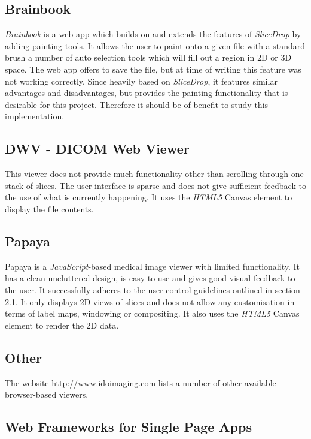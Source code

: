 \documentclass[a4paper,11pt,titlepage]{article}
\begin{document}
\subsection{Brainbook}
\textit{Brainbook}\cite{brainbook} is a web-app which builds on and extends the features of \textit{SliceDrop} by adding painting tools. It allows the user to paint onto a given file with a standard brush a number of auto selection tools which will fill out a region in 2D or 3D space. The web app offers to save the file, but at time of writing this feature was not working correctly. Since heavily based on \textit{SliceDrop}, it features similar advantages and disadvantages, but provides the painting functionality that is desirable for this project. Therefore it should be of benefit to study this implementation.

\subsection{DWV - DICOM Web Viewer}
This viewer does not provide much functionality other than scrolling through one stack of slices. The user interface is sparse and does not give sufficient feedback to the use of what is currently happening. It uses the \textit{HTML5} Canvas element to display the file contents.



\subsection{Papaya}
Papaya\cite{papaya} is a \textit{JavaScript}-based medical image viewer with limited functionality. It has a clean uncluttered design, is easy to use and gives good visual feedback to the user. It successfully adheres to the user control guidelines outlined in section 2.1. It only displays 2D views of slices and does not allow any customisation in terms of label maps, windowing or compositing. It also uses the \textit{HTML5} Canvas element to render the 2D data.



\subsection{Other}

The website \url{http://www.idoimaging.com} lists a number of other available browser-based viewers.


\subsection{Web Frameworks for Single Page Apps}
\end{document}
